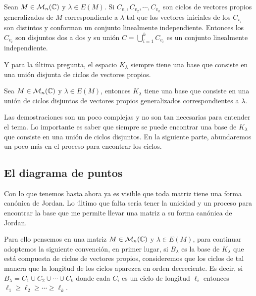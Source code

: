 \begin{teor} \label{teor:IndepCiclos}
  Sean $M \in \mathcal{M}_n(\mathbb{C})$ y $\lambda\in E(M)$. Si $C_{v_1}, C_{v_2}, \cdots, C_{v_k}$ son ciclos de vectores propios generalizados de $M$ correspondiente a $\lambda$ tal que los vectores iniciales de los $C_{v_i}$ son distintos y conforman un conjunto linealmente independiente. Entonces los $C_{v_i}$ son disjuntos dos a dos y su unión $C = \bigcup_{i=1}^k C_{v_i}$ es un conjunto linealmente independiente.
\end{teor}

 Y para la última pregunta, el espacio $K_\lambda$ siempre tiene una base que consiste en una unión disjunta de ciclos de vectores propios.

\begin{teor}
  Sea $M \in \mathcal{M}_n(\mathbb{C})$ y $\lambda \in E(M)$, entonces $K_\lambda$ tiene una base que consiste en una unión de ciclos disjuntos de vectores propios generalizados correspondientes a $\lambda$.
\end{teor}

Las demostraciones son un poco complejas y no son tan necesarias para entender el tema. Lo importante es saber que siempre se puede encontrar una base de $K_\lambda$ que consiste en una unión de ciclos disjuntos. En la siguiente parte, abundaremos un poco más en el proceso para encontrar los ciclos.



\subsection{El diagrama de puntos}

Con lo que tenemos hasta ahora ya es visible que toda matriz tiene una forma canónica de Jordan. Lo último que falta sería tener la unicidad y un proceso para encontrar la base que me permite llevar una matriz a su forma canónica de Jordan.

Para ello pensemos en una matriz $M\in\mathcal{M}_n(\mathbb{C})$ y $\lambda \in E(M)$, para continuar adoptemos la siguiente convención, en primer lugar, si $B_\lambda$ es la base de $K_\lambda$ que está compuesta de ciclos de vectores propios, consideremos que los ciclos de tal manera que la longitud de los ciclos aparezca en orden decreciente. Es decir, si $B_\lambda = C_1 \cup C_2 \cup \cdots \cup C_k$ donde cada $C_i$ es un ciclo de longitud $\ell_i$ entonces $\ell_1 \geq \ell_2 \geq \cdots \geq \ell_k$.

